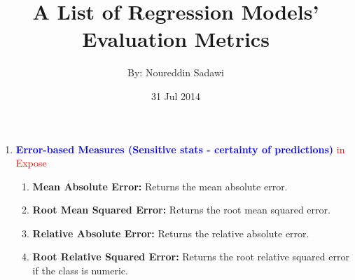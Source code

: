 \documentclass[a4paper,12pt, english]{article}
\begin{document}
\title{A List of Regression Models' Evaluation Metrics}
\date{31 Jul 2014}
\author{By: Noureddin Sadawi}
\maketitle

\large

\begin{enumerate}

\item \textbf{\textcolor{blue}{Error-based Measures (Sensitive stats - certainty of predictions)}} \textcolor{red}{in Expose}
\begin{enumerate}

\item \textbf{Mean Absolute Error: }
      Returns the mean absolute error. %
     

\item \textbf{Root Mean Squared Error: }
      Returns the root mean squared error. %
                 

\item \textbf{Relative Absolute Error: }
      Returns the relative absolute error. %
      
          
\item \textbf{Root Relative Squared Error: }
      Returns the root relative squared error if the class is numeric. %
      

\end{enumerate}
\end{enumerate}
\end{document}
